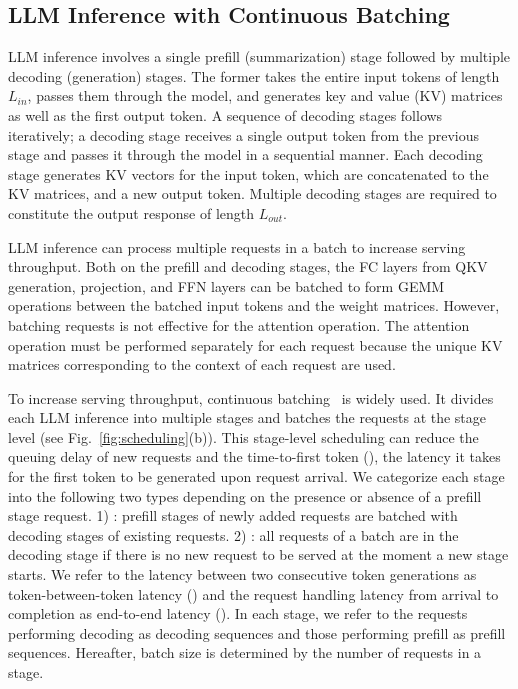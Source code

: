 \subsection{LLM Inference with Continuous Batching}
\label{sec:background:inference}

LLM inference involves a single prefill (summarization) stage followed by multiple decoding (generation) stages.
The former takes the entire input tokens of length $L_{in}$, passes them through the model, and generates key and value (KV) matrices as well as the first output token.
A sequence of decoding stages follows iteratively; a decoding stage receives a single output token from the previous stage and passes it through the model in a sequential manner.
Each decoding stage generates KV vectors for the input token, which are concatenated to the KV matrices, and a new output token.
Multiple decoding stages are required to constitute the output response of length $L_{out}$.

LLM inference can process multiple requests in a batch to increase serving throughput.
Both on the prefill and decoding stages, the FC layers from QKV generation, projection, and FFN layers can be batched to form GEMM operations between the batched input tokens and the weight matrices.
However, batching requests is not effective for the attention operation.
The attention operation must be performed separately for each request because the unique KV matrices corresponding to the context of each request are used.


To increase serving throughput, continuous batching~\cite{osdi-2022-orca} is widely used.
It divides each LLM inference into multiple stages and batches the requests at the stage level (see Fig.~\ref{fig:scheduling}(b)).
This stage-level scheduling can reduce the queuing delay of new requests and the time-to-first token (\ttft), the latency it takes for the first token to be generated upon request arrival.
We categorize each stage into the following two types depending on the presence or absence of a prefill stage request.
1) \mixedstage: prefill stages of newly added requests are batched with decoding stages of existing requests. 2) \deconlystage: all requests of a batch are in the decoding stage if there is no new request to be served at the moment a new stage starts.
We refer to the latency between two consecutive token generations as token-between-token latency (\tbt) and the request handling latency from arrival to completion as end-to-end latency (\ete).
In each stage, we refer to the requests performing decoding as decoding sequences and those performing prefill as prefill sequences.
Hereafter, batch size is determined by the number of requests in a stage.

